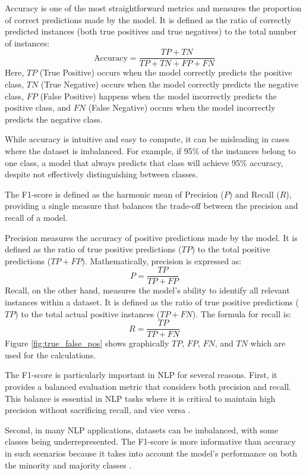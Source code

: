 \documentclass{Configuration_Files/PoliMi3i_thesis}
\begin{document}
Accuracy is one of the most straightforward metrics and measures the proportion of correct predictions made by the model. It is defined as the ratio of correctly predicted instances (both true positives and true negatives) to the total number of instances:
\[
\text{Accuracy} = \frac{TP + TN}{TP + TN + FP + FN}
\]
Here, \( TP \) (True Positive) occurs when the model correctly predicts the positive class, \( TN \) (True Negative) occurs when the model correctly predicts the negative class, \( FP \) (False Positive) happens when the model incorrectly predicts the positive class, and \( FN \) (False Negative) occurs when the model incorrectly predicts the negative class.

While accuracy is intuitive and easy to compute, it can be misleading in cases where the dataset is imbalanced. For example, if 95\% of the instances belong to one class, a model that always predicts that class will achieve 95\% accuracy, despite not effectively distinguishing between classes.

The F1-score is defined as the harmonic mean of Precision (\( P \)) and Recall (\( R \)), providing a single measure that balances the trade-off between the precision and recall of a model.

Precision measures the accuracy of positive predictions made by the model. It is defined as the ratio of true positive predictions (\( TP \)) to the total positive predictions (\( TP + FP \)). Mathematically, precision is expressed as:
\[
P = \frac{TP}{TP + FP}
\]
Recall, on the other hand, measures the model's ability to identify all relevant instances within a dataset. It is defined as the ratio of true positive predictions (\( TP \)) to the total actual positive instances (\( TP + FN \)). The formula for recall is:
\[
R = \frac{TP}{TP + FN}
\]
Figure \ref{fig:true_false_pos} shows graphically \( TP \), \( FP \), \( FN \), and \( TN \) which are used for the calculations.

The F1-score is particularly important in NLP for several reasons. First, it provides a balanced evaluation metric that considers both precision and recall. This balance is essential in NLP tasks where it is critical to maintain high precision without sacrificing recall, and vice versa \cite{li2022survey}. 

Second, in many NLP applications, datasets can be imbalanced, with some classes being underrepresented. The F1-score is more informative than accuracy in such scenarios because it takes into account the model's performance on both the minority and majority classes \cite{he2009learning}. 
\end{document}
